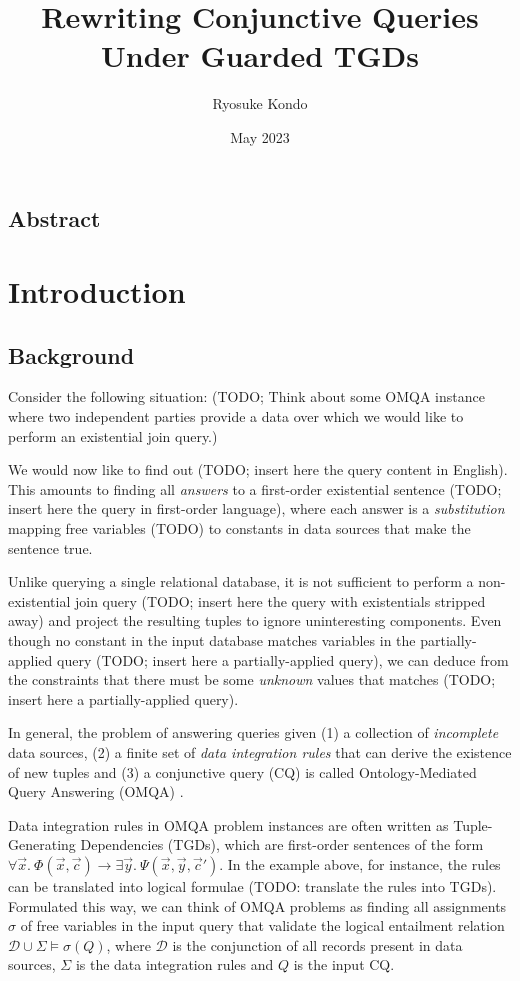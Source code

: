 \documentclass[12pt]{report}
\title{Rewriting Conjunctive Queries \\ Under Guarded TGDs}
\author{Ryosuke Kondo}
\date{May 2023}
\theoremstyle{plain}
\theoremstyle{definition}
\begin{document}
\maketitle

\newpage
\tableofcontents
\newpage

\section*{Abstract}

\newpage
\chapter{Introduction}
\label{introduction}

\section{Background}

Consider the following situation: (TODO; Think about some OMQA instance where two independent parties provide a data over which we would like to perform an existential join query.)

We would now like to find out (TODO; insert here the query content in English). This amounts to finding all \emph{answers} to a first-order existential sentence (TODO; insert here the query in first-order language), where each answer is a \emph{substitution} mapping free variables (TODO) to constants in data sources that make the sentence true.

Unlike querying a single relational database, it is not sufficient to perform a non-existential join query (TODO; insert here the query with existentials stripped away) and project the resulting tuples to ignore uninteresting components. Even though no constant in the input database matches variables in the partially-applied query (TODO; insert here a partially-applied query), we can deduce from the constraints that there must be some \emph{unknown} values that matches (TODO; insert here a partially-applied query).

In general, the problem of answering queries given (1) a collection of \emph{incomplete} data sources, (2) a finite set of \emph{data integration rules} that can derive the existence of new tuples and (3) a conjunctive query (CQ) is called Ontology-Mediated Query Answering (OMQA) \cite{bienvenu16}.

Data integration rules in OMQA problem instances are often written as Tuple-Generating Dependencies (TGDs), which are first-order sentences of the form $\forall \vec{x}.\ \Phi(\vec{x}, \vec{c}) \rightarrow \exists \vec{y}.\ \Psi(\vec{x}, \vec{y}, \vec{c}')$. In the example above, for instance, the rules can be translated into logical formulae (TODO: translate the rules into TGDs). Formulated this way, we can think of OMQA problems as finding all assignments $\sigma$ of free variables in the input query that validate the logical entailment relation $\mathcal{D} \cup \Sigma \models \sigma(Q)$, where $\mathcal{D}$ is the conjunction of all records present in data sources, $\Sigma$ is the data integration rules and $Q$ is the input CQ.
\end{document}
